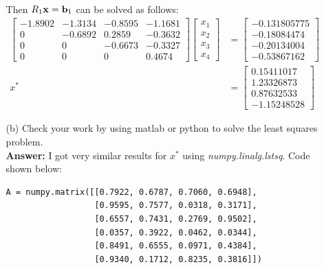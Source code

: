 \documentclass{article}
\newcommand{\bx}{{\bf x}}
\newcommand{\bb}{{\bf b}}
\begin{document}
\begin{itemize}
\begin{itemize}
\begin{align*}
                        \end{align*}
                        Then $R_1\bx=\bb_1$ can be solved as follows:
                        \begin{align*}
                              \begin{bmatrix}
                                    -1.8902 & -1.3134 & -0.8595 & -1.1681 \\ 0 & -0.6892 & 0.2859 & -0.3632 \\ 0 & 0 & -0.6673 & -0.3327 \\ 0 & 0 & 0 & 0.4674
                              \end{bmatrix}
                              \begin{bmatrix}
                                    x_1 \\x_2\\x_3\\x_4
                              \end{bmatrix} & =\begin{bmatrix}
                                    -0.131805775 \\ -0.18084474 \\ -0.20134004 \\ -0.53867162
                              \end{bmatrix} \\
                              x^{*} & =\boxed{\begin{bmatrix}
                                    0.15411017 \\1.23326873\\0.87632533\\-1.15248528
                              \end{bmatrix}}
                        \end{align*}
                  \item [(b)] Check your work by using matlab or python to solve the least squares problem.\\
                        \textbf{Answer:} I got very similar results for $x^{*}$ using \textit{numpy.linalg.lstsq}. Code shown below:
                        \begin{verbatim}
A = numpy.matrix([[0.7922, 0.6787, 0.7060, 0.6948],
                  [0.9595, 0.7577, 0.0318, 0.3171],
                  [0.6557, 0.7431, 0.2769, 0.9502],
                  [0.0357, 0.3922, 0.0462, 0.0344],
                  [0.8491, 0.6555, 0.0971, 0.4384],
                  [0.9340, 0.1712, 0.8235, 0.3816]])

\end{verbatim}
\end{itemize}
\end{itemize}
\end{document}
